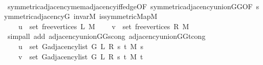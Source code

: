 \begin{isabellebody}
\ \ \ \ \isamarkupfalse%
\ symmetric{\isacharunderscore}{\kern0pt}adjacency{\isachardot}{\kern0pt}mem{\isacharunderscore}{\kern0pt}adjacency{\isacharunderscore}{\kern0pt}iff{\isacharunderscore}{\kern0pt}edge{\isacharbrackleft}{\kern0pt}OF\ symmetric{\isacharunderscore}{\kern0pt}adjacency{\isacharunderscore}{\kern0pt}union{\isacharunderscore}{\kern0pt}G{}{\isacharunderscore}{\kern0pt}G{}{\isacharbrackleft}{\kern0pt}OF\ symmetric{\isacharunderscore}{\kern0pt}adjacency{\isacharunderscore}{\kern0pt}G\ invar{\isacharunderscore}{\kern0pt}M\ is{\isacharunderscore}{\kern0pt}symmetric{\isacharunderscore}{\kern0pt}Map{\isacharunderscore}{\kern0pt}M{\isacharbrackright}{\kern0pt}{\isacharbrackright}{\kern0pt}\isanewline
\ \ \ \ \isacommand{{\isachardot}{\kern0pt}}\isamarkupfalse%
\isanewline
\ \ \isamarkupfalse%
\isanewline
\ \ \ \ {\isachardoublequoteopen}u\ {\isasymin}\ set\ {\isacharparenleft}{\kern0pt}free{\isacharunderscore}{\kern0pt}vertices\ L\ M{\isacharparenright}{\kern0pt}{\isachardoublequoteclose}\isanewline
\ \ \ \ {\isachardoublequoteopen}v\ {\isasymin}\ set\ {\isacharparenleft}{\kern0pt}free{\isacharunderscore}{\kern0pt}vertices\ R\ M{\isacharparenright}{\kern0pt}{\isachardoublequoteclose}\isanewline
\ \ \ \ \isamarkupfalse%
\ {\isacharparenleft}{\kern0pt}simp{\isacharunderscore}{\kern0pt}all\ add{\isacharcolon}{\kern0pt}\ adjacency{\isacharunderscore}{\kern0pt}union{\isacharunderscore}{\kern0pt}G{}{\isacharunderscore}{\kern0pt}G{}{\isacharunderscore}{\kern0pt}s{\isacharunderscore}{\kern0pt}cong\ adjacency{\isacharunderscore}{\kern0pt}union{\isacharunderscore}{\kern0pt}G{}{\isacharunderscore}{\kern0pt}G{}{\isacharunderscore}{\kern0pt}t{\isacharunderscore}{\kern0pt}cong{\isacharparenright}{\kern0pt}\isanewline
\ \ \isamarkupfalse%
\isanewline
\ \ \ \ {\isachardoublequoteopen}u\ {\isasymin}\ set\ {\isacharparenleft}{\kern0pt}G{\isachardot}{\kern0pt}adjacency{\isacharunderscore}{\kern0pt}list\ {\isacharparenleft}{\kern0pt}G{}\ L\ R\ s\ t\ M{\isacharparenright}{\kern0pt}\ s{\isacharparenright}{\kern0pt}{\isachardoublequoteclose}\isanewline
\ \ \ \ {\isachardoublequoteopen}v\ {\isasymin}\ set\ {\isacharparenleft}{\kern0pt}G{\isachardot}{\kern0pt}adjacency{\isacharunderscore}{\kern0pt}list\ {\isacharparenleft}{\kern0pt}G{}\ L\ R\ s\ t\ M{\isacharparenright}{\kern0pt}\ t{\isacharparenright}{\kern0pt}{\isachardoublequoteclose}\isanewline
\ \ \isamarkupfalse%
\ {\isacharminus}{\kern0pt}\isanewline

\end{isabellebody}
